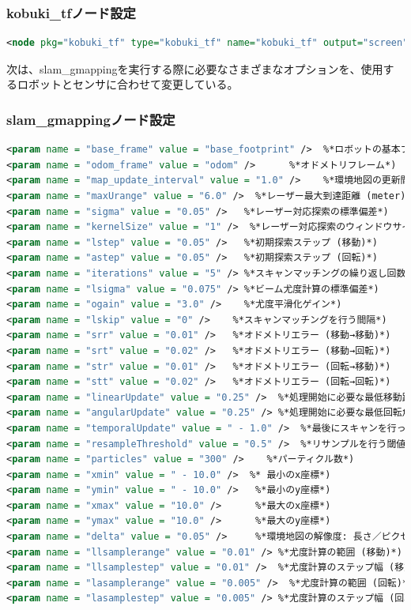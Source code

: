 \subsubsection{kobuki\_tfノード設定}

\begin{lstlisting}[language=XML]
<node pkg="kobuki_tf" type="kobuki_tf" name="kobuki_tf" output="screen"> </node>
\end{lstlisting}

次は、slam\_gmappingを実行する際に必要なさまざまなオプションを、使用するロボットとセンサに合わせて変更している。

\subsubsection{slam\_gmappingノード設定}

\begin{lstlisting}[language=XML]
<param name = "base_frame" value = "base_footprint" />  %*ロボットの基本フレーム*)
<param name = "odom_frame" value = "odom" />      %*オドメトリフレーム*)
<param name = "map_update_interval" value = "1.0" />    %*環境地図の更新間隔 (sec)*)
<param name = "maxUrange" value = "6.0" />  %*レーザー最大到達距離 (meter)*)
<param name = "sigma" value = "0.05" />   %*レーザー対応探索の標準偏差*)
<param name = "kernelSize" value = "1" />  %*レーザー対応探索のウィンドウサイズ*)
<param name = "lstep" value = "0.05" />   %*初期探索ステップ (移動)*)
<param name = "astep" value = "0.05" />   %*初期探索ステップ (回転)*)
<param name = "iterations" value = "5" /> %*スキャンマッチングの繰り返し回数*)
<param name = "lsigma" value = "0.075" /> %*ビーム尤度計算の標準偏差*)
<param name = "ogain" value = "3.0" />    %*尤度平滑化ゲイン*)
<param name = "lskip" value = "0" />    %*スキャンマッチングを行う間隔*)
<param name = "srr" value = "0.01" />   %*オドメトリエラー (移動→移動)*)
<param name = "srt" value = "0.02" />   %*オドメトリエラー (移動→回転)*)
<param name = "str" value = "0.01" />   %*オドメトリエラー (回転→移動)*)
<param name = "stt" value = "0.02" />   %*オドメトリエラー (回転→回転)*)
<param name = "linearUpdate" value = "0.25" />  %*処理開始に必要な最低移動距離*)
<param name = "angularUpdate" value = "0.25" /> %*処理開始に必要な最低回転角度*)
<param name = "temporalUpdate" value = " - 1.0" />  %*最後にスキャンを行った時間がこの更新時間を過ぎた場合、スキャンを行う。この値が0以下の場合は使用しない。*)
<param name = "resampleThreshold" value = "0.5" />  %*リサンプルを行う閾値*)
<param name = "particles" value = "300" />    %*パーティクル数*)
<param name = "xmin" value = " - 10.0" />  %* 最小のx座標*)
<param name = "ymin" value = " - 10.0" />   %*最小のy座標*)
<param name = "xmax" value = "10.0" />      %*最大のx座標*)
<param name = "ymax" value = "10.0" />      %*最大のy座標*)
<param name = "delta" value = "0.05" />     %*環境地図の解像度: 長さ／ピクセル*)
<param name = "llsamplerange" value = "0.01" /> %*尤度計算の範囲 (移動)*)
<param name = "llsamplestep" value = "0.01" />  %*尤度計算のステップ幅 (移動)*)
<param name = "lasamplerange" value = "0.005" />  %*尤度計算の範囲 (回転)*)
<param name = "lasamplestep" value = "0.005" /> %*尤度計算のステップ幅 (回転)*)
\end{lstlisting}

